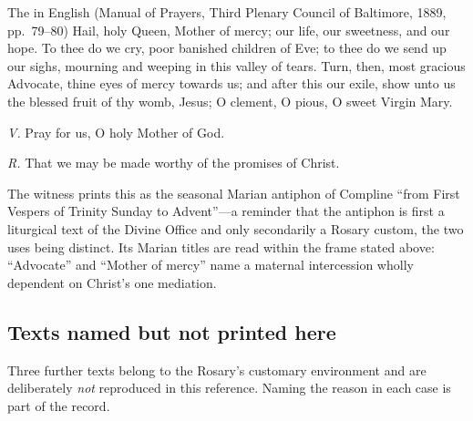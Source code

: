 \begin{receivedtext}{The  in English (Manual of
Prayers, Third Plenary Council of Baltimore, 1889, pp.~79--80)}
Hail, holy Queen, Mother of mercy; our life, our sweetness, and our
hope. To thee do we cry, poor banished children of Eve; to thee do we
send up our sighs, mourning and weeping in this valley of tears. Turn,
then, most gracious Advocate, thine eyes of mercy towards us; and after
this our exile, show unto us the blessed fruit of thy womb, Jesus; O
clement, O pious, O sweet Virgin Mary.

\vspace{0.4em}
\emph{V.} Pray for us, O holy Mother of God.

\emph{R.} That we may be made worthy of the promises of Christ.
\end{receivedtext}

\noindent The witness prints this as the seasonal Marian antiphon of
Compline ``from First Vespers of Trinity Sunday to Advent''---a reminder
that the antiphon is first a liturgical text of the Divine Office and
only secondarily a Rosary custom, the two uses being distinct. Its
Marian titles are read within the frame stated above: ``Advocate'' and
``Mother of mercy'' name a maternal intercession wholly dependent on
Christ's one mediation.

\subsection{Texts named but not printed here}
\label{sec:notprinted}

Three further texts belong to the Rosary's customary environment and are
deliberately \emph{not} reproduced in this reference. Naming the reason
in each case is part of the record.

